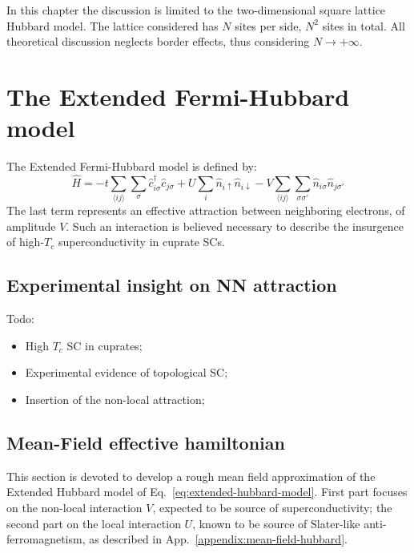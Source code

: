 In this chapter the discussion is limited to the two-dimensional square lattice Hubbard model. The lattice considered has $N$ sites per side, $N^2$ sites in total. All theoretical discussion neglects border effects, thus considering $N \to +\infty$.

\section{The Extended Fermi-Hubbard model}

The Extended Fermi-Hubbard model is defined by:
\begin{equation}\label{eq:extended-hubbard-model}
	\hat H =
	-t \sum_{\langle ij \rangle} \sum_\sigma \hat c_{i\sigma}^\dagger \hat c_{j\sigma}
	+ U \sum_i \hat n_{i\uparrow} \hat n_{i\downarrow}
	- V \sum_{\langle ij \rangle} \sum_{\sigma \sigma'} \hat n_{i\sigma} \hat n_{j\sigma'}
\end{equation}
The last term represents an effective attraction between neighboring electrons, of amplitude $V$. Such an interaction is believed \cite{cao2025p-wave} necessary to describe the insurgence of high-$T_c$ superconductivity in cuprate SCs. \todo

\subsection{Experimental insight on NN attraction}

{\color{tabred}Todo:
\begin{itemize}
	\item High $T_c$ SC in cuprates;
	\item Experimental evidence of topological SC;
	\item Insertion of the non-local attraction;
\end{itemize}}

\subsection{Mean-Field effective hamiltonian}

This section is devoted to develop a rough mean field approximation of the Extended Hubbard model of Eq.~\eqref{eq:extended-hubbard-model}. First part focuses on the non-local interaction $V$, expected to be source of superconductivity; the second part on the local interaction $U$, known to be source of Slater-like anti-ferromagnetism, as described in App.~\ref{appendix:mean-field-hubbard}.

